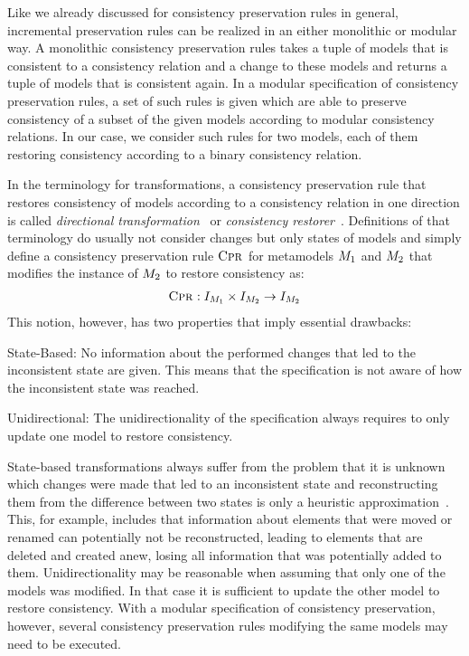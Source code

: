 Like we already discussed for consistency preservation rules in general, incremental preservation rules can be realized in an either monolithic or modular way.
A monolithic consistency preservation rules takes a tuple of models that is consistent to a consistency relation and a change to these models and returns a tuple of models that is consistent again.
In a modular specification of consistency preservation rules, a set of such rules is given which are able to preserve consistency of a subset of the given models according to modular consistency relations.
In our case, we consider such rules for two models, each of them restoring consistency according to a binary consistency relation.

In the terminology for transformations, a consistency preservation rule that restores consistency of models according to a consistency relation in one direction is called \emph{directional transformation}~\cite{stevens2010sosym} or \emph{consistency restorer}~\cite{stevens2020BidirectionalTransformationLarge-SoSym}.
Definitions of that terminology do usually not consider changes but only states of models and simply define a consistency preservation rule $\textsc{Cpr}_{}$ for metamodels $\metamodel{M}{1}$ and $\metamodel{M}{2}$ that modifies the instance of $\metamodel{M}{2}$ to restore consistency as:
\begin{align*}
    \consistencypreservationrule{}: \metamodelinstanceset{M}{1} \times \metamodelinstanceset{M}{2} \rightarrow \metamodelinstanceset{M}{2}
\end{align*}
This notion, however, has two properties that imply essential drawbacks:
\begin{properdescription}
    \item[State-Based:] No information about the performed changes that led to the inconsistent state are given. This means that the specification is not aware of how the inconsistent state was reached.
    \item[Unidirectional:] The unidirectionality of the specification always requires to only update one model to restore consistency.
\end{properdescription}
State-based transformations always suffer from the problem that it is unknown which changes were made that led to an inconsistent state and reconstructing them from the difference between two states is only a heuristic approximation~\cite{diskin2011StateToDeltaSymmetric-MODELS}.
This, for example, includes that information about elements that were moved or renamed can potentially not be reconstructed, leading to elements that are deleted and created anew, losing all information that was potentially added to them.
Unidirectionality may be reasonable when assuming that only one of the models was modified. In that case it is sufficient to update the other model to restore consistency.
With a modular specification of consistency preservation, however, several consistency preservation rules modifying the same models may need to be executed.


